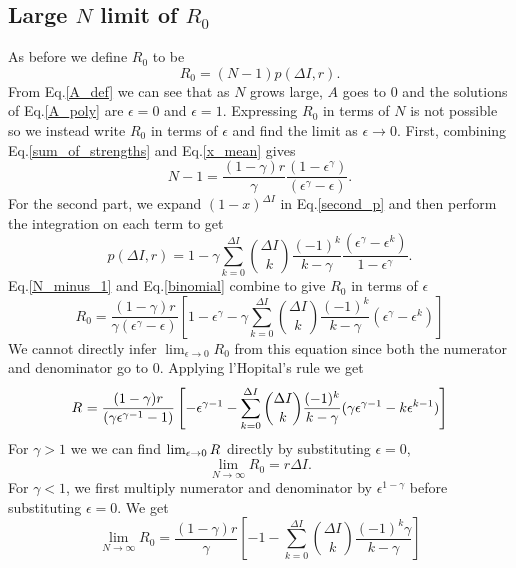\documentclass[10pt]{article}
\begin{document}
\begin{multicols}{2}
\section{Large $N$ limit of $R_{0}$} 
As before we define $R_{0}$ to be 
\begin{equation}
R_{0}=(N-1)p(\Delta I,r).
\end{equation}
From Eq.\eqref{A_def} we can see that as $N$ grows large, $A$ goes to $0$ and the solutions of Eq.\eqref{A_poly} are $\epsilon=0$ and $\epsilon=1$. Expressing $R_{0}$ in terms of $N$ is not possible so we instead write $R_{0}$ in terms of $\epsilon$ and find the limit as $\epsilon\rightarrow 0$. First, combining Eq.\eqref{sum_of_strengths} and Eq.\eqref{x_mean} gives
\begin{equation}
\label{N_minus_1}
N-1=\frac{(1-\gamma)r}{\gamma} \frac{(1-\epsilon^{ \gamma})}{(\epsilon^{\gamma}-\epsilon)}.
\end{equation}
For the second part, we expand $(1-x)^{\Delta I}$ in Eq.\eqref{second_p} and then perform the integration on each term to get
\begin{equation}
\label{binomial}
p(\Delta I,r)=1-\gamma\sum_{k=0}^{\Delta I}\binom{\Delta I}{k}\frac{(-1)^{k}}{k-\gamma}\frac{(\epsilon^{\gamma}-\epsilon^{k})}{1-\epsilon^{\gamma}}.
\end{equation}
Eq.\eqref{N_minus_1} and Eq.\eqref{binomial} combine to give $R_{0}$ in terms of $\epsilon$
\begin{equation}
R_{0}=\frac{(1-\gamma)r}{\gamma(\epsilon^{\gamma}-\epsilon)}\left[1-\epsilon^{\gamma}-\gamma\sum_{k=0}^{\Delta I}\binom{\Delta I}{k}\frac{(-1)^{k}}{k-\gamma}(\epsilon^{\gamma}-\epsilon^{k})\right]
\end{equation}
We cannot directly infer $\lim_{\epsilon\rightarrow 0}R_{0}$ from this equation since both the numerator and denominator go to $0$. Applying l'Hopital's rule we get
\begin{equation}
R^{\*}=\frac{(1-\gamma)r}{(\gamma\epsilon^{\gamma-1}-1)}\left[-\epsilon^{\gamma-1}-\sum_{k=0}^{\Delta I}\binom{\Delta I}{k}\frac{(-1)^{k}}{k-\gamma}(\gamma\epsilon^{\gamma-1}-k\epsilon^{k-1})\right]
\end{equation}
For $\gamma>1$ we we can find $\lim_{\epsilon\rightarrow 0}R^{\*}$ directly by substituting $\epsilon=0$,
\begin{equation}
\lim_{N\rightarrow \infty}R_{0}=r\Delta I.
\end{equation}
For $\gamma<1$, we first multiply numerator and denominator by $\epsilon^{1-\gamma}$ before substituting $\epsilon=0$. We get
\begin{equation}
\lim_{N\rightarrow \infty}R_{0}=\frac{(1-\gamma)r}{\gamma}\left[-1-\sum_{k=0}^{\Delta I}\binom{\Delta I}{k}\frac{(-1)^{k}\gamma}{k-\gamma}\right]
\end{equation}
\end{multicols}
\end{document}
